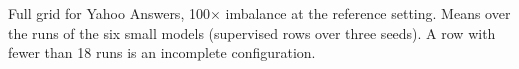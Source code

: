 \begin{table}[t]
  \centering
  \footnotesize
  
  \caption{Full grid for Yahoo Answers, 100$\times$ imbalance at the reference setting. Means over the runs of the six small models (supervised rows over three seeds). A row with fewer than 18 runs is an incomplete configuration.}
  \label{tab:grid_yahoo_imb100}
\end{table}
